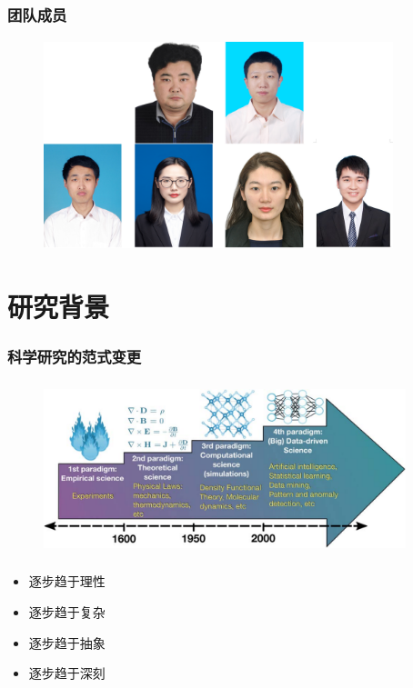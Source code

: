 \frame
{
	\frametitle{团队成员}
\begin{figure}[h!]
\vspace*{-0.10in}
\centering
\includegraphics[height=2.40in,width=4.00in,viewport=0 0 430 270,clip]{Figures/Team_Member.png}
\label{Team_Membwe}
\end{figure}
}

\section{研究背景}
\frame
{
	\frametitle{科学研究的范式变更}
\begin{figure}[h!]
\vspace*{-0.28in}
\centering
\includegraphics[height=2.00in,width=4.15in]{Figures/Four_Model_3.png}
\label{Four_Model}
\end{figure}
\begin{minipage}[b]{0.48\textwidth}
 {\fontsize{7.5pt}{6.0pt}\selectfont\begin{itemize}%
	 \setlength{\itemsep}{10pt}
 \item 逐步趋于理性
 \item 逐步趋于复杂
 \end{itemize}}
\end{minipage}
\hfill
\begin{minipage}[b]{0.48\textwidth}
 {\fontsize{7.5pt}{6.0pt}\selectfont\begin{itemize}%
	 \setlength{\itemsep}{10pt}
 \item 逐步趋于抽象
 \item 逐步趋于深刻
 \end{itemize}}
\end{minipage}
}

